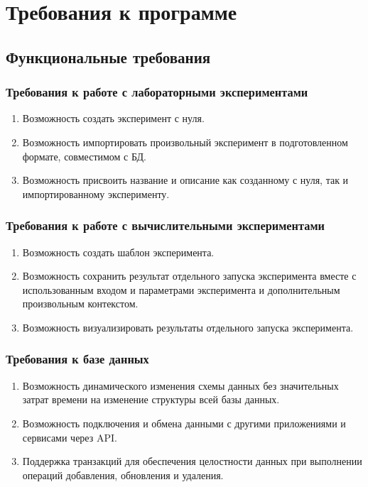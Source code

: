 \documentclass[a4paper,12pt,reqno]{article}
\begin{document}
    \section{Требования к программе}

    \subsection{Функциональные требования}

    \subsubsection{Требования к работе с лабораторными экспериментами} \label{label:lab_exp}
    \begin{enumerate}
        \item Возможность создать эксперимент с нуля.
        \item Возможность импортировать произвольный эксперимент в подготовленном формате, совместимом с БД.
        \item Возможность присвоить название и описание как созданному с нуля, так и импортированному эксперименту.
    \end{enumerate}

    \subsubsection{Требования к работе с вычислительными экспериментами} \label{label:comp_exp}
    \begin{enumerate}
        \item Возможность создать шаблон эксперимента.
        \item Возможность сохранить результат отдельного запуска эксперимента вместе с использованным входом и параметрами эксперимента и дополнительным произвольным контекстом.
        \item Возможность визуализировать результаты отдельного запуска эксперимента.
    \end{enumerate}

    \subsubsection{Требования к базе данных}
    \begin{enumerate}
        \item Возможность динамического изменения схемы данных без значительных затрат времени на изменение структуры всей базы данных.
        \item Возможность подключения и обмена данными с другими приложениями и сервисами через API.
        \item Поддержка транзакций для обеспечения целостности данных при выполнении операций добавления, обновления и удаления.
    \end{enumerate}
\end{document}

